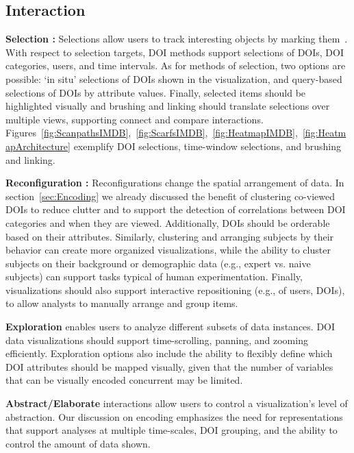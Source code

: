 \subsection{Interaction}
\label{sec:Interaction}

\noindent \textbf{Selection :} Selections allow users to track interesting objects by marking them~\cite{Yi07}. With respect to selection targets, DOI methods support selections of DOIs, DOI categories, users, and time intervals.  As for methods of selection, two options are possible: `in situ' selections of DOIs shown in the visualization, and query-based selections of DOIs by attribute values. Finally, selected items should be highlighted visually and brushing and linking should translate selections over multiple views, supporting connect and compare interactions. Figures~\ref{fig:ScanpathsIMDB},~\ref{fig:ScarfsIMDB},~\ref{fig:HeatmapIMDB},~\ref{fig:HeatmapArchitecture} exemplify DOI selections, time-window selections, and brushing and linking.

\noindent \textbf{Reconfiguration :}
Reconfigurations change the spatial arrangement of data.  In section~\ref{sec:Encoding} we already discussed the benefit of clustering co-viewed DOIs to reduce clutter and to support the detection of correlations between DOI categories and when they are viewed. Additionally, DOIs should be orderable based on their attributes. Similarly, clustering and arranging subjects by their behavior can create more organized visualizations, while the ability to cluster subjects on their background or demographic data (e.g., expert vs. naive subjects) can support tasks typical of human experimentation. Finally, visualizations should also support interactive repositioning (e.g., of users, DOIs), to allow analysts to manually arrange and group items.


\noindent \textbf{Exploration} enables users to analyze different subsets of data instances. DOI data visualizations should support time-scrolling, panning, and zooming efficiently. Exploration options also include the ability to flexibly define which DOI attributes should be mapped visually, given that the number of variables that can be visually encoded concurrent may be limited. 
	
\noindent \textbf{Abstract/Elaborate} interactions allow users to control a visualization's level of abstraction. Our discussion on encoding emphasizes the need for representations that support analyses at multiple time-scales, DOI grouping, and the ability to control the amount of data shown. 

